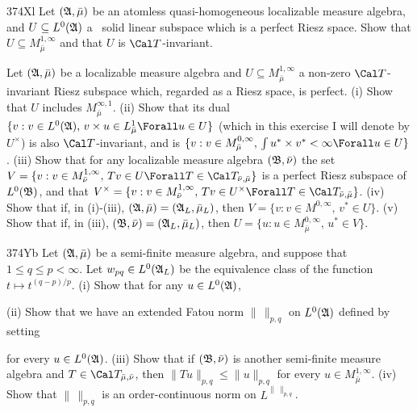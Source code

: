 {\spheader 374Xl Let $(\frak A,\bar\mu)$ be an atomless quasi-homogeneous
localizable measure algebra, and $U\subseteq L^0(\frak A)$ a
\ri\ solid linear subspace which is a perfect Riesz
space.   Show that $U\subseteq M^{1,\infty}_{\bar\mu}$ and that $U$ is
$\Cal T$-invariant.   

Let $(\frak A,\bar\mu)$ be a localizable measure algebra and
$U\subseteq M^{1,\infty}_{\bar\mu}$ a non-zero
$\Cal T$-invariant Riesz subspace which, regarded as a Riesz space, is
perfect.   (i) Show that $U$ includes $M^{\infty,1}_{\bar\mu}$.   (ii)
Show that its dual
$\{v:v\in L^0(\frak A),\,v\times u\in L^1_{\bar\mu}\Forall u\in U\}$
(which in this exercise I will denote by $U^{\times}$) is also
$\Cal T$-invariant, and is $\{v:v\in M^{0,\infty}_{\bar\mu},\,\int
u^*\times v^*<\infty\Forall u\in U\}$.   (iii) Show that for any
localizable measure algebra $(\frak B,\bar\nu)$ the set
$V=\{v:v\in M^{1,\infty}_{\bar\nu},\,Tv\in U
\Forall T\in\Cal T_{\bar\nu,\bar\mu}\}$ is a perfect Riesz subspace of
$L^0(\frak B)$,
and that $V^{\times}=\{v:v\in M^{1,\infty}_{\bar\nu},\,Tv\in
U^{\times}\Forall T\in\Cal T_{\bar\nu,\bar\mu}\}$.   (iv) Show that
if, in (i)-(iii), $(\frak A,\bar\mu)=(\frak A_L,\bar\mu_L)$, then
$V=\{v:v\in M^{0,\infty},\,v^*\in U\}$.   (v) Show that if, in (iii),
$(\frak B,\bar\nu)=(\frak A_L,\bar\mu_L)$, then
$U=\{u:u\in M^{0,\infty}_{\bar\mu},\,u^*\in V\}$.

\spheader 374Yb Let $(\frak A,\bar\mu)$ be a semi-finite measure
algebra, and
suppose that $1\le q\le p<\infty$.   Let $w_{pq}\in L^0(\frak A_L)$ be
the equivalence class of the function $t\mapsto t^{(q-p)/p}$.   (i) Show
that for any $u\in L^0(\frak A)$,


\noindent (ii) Show that we have an extended Fatou norm $\|\,\|_{p,q}$
on $L^0(\frak A)$ defined by setting


\noindent for every $u\in L^0(\frak A)$.      (iii) Show that if
$(\frak B,\bar\nu)$ is another semi-finite measure algebra and
$T\in\Cal T_{\bar\mu,\bar\nu}$, then $\|Tu\|_{p,q}\le\|u\|_{p,q}$ for
every $u\in M^{1,\infty}_{\bar\mu}$.   (iv) Show that $\|\,\|_{p,q}$ is
an order-continuous norm on $L^{\|\,\|_{p,q}}$.

}

